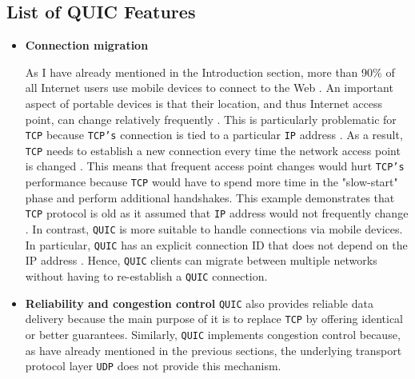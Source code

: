 \documentclass[12pt,a4paper,twoside,openright]{report}
\begin{document}
\subsection{List of QUIC Features}
\begin{itemize}
 \item \textbf{Connection migration} 
 
    As I have already mentioned in the Introduction section, more than 90\% of all Internet users use mobile devices to connect to the Web \cite{bib_number_of_mobile_users}.
    An important aspect of portable devices is that their location, and thus Internet access point, can change relatively frequently \cite{PollardBarry2019HiAP}.
    This is particularly problematic for \texttt{TCP} because \texttt{TCP's} connection is tied to a particular \texttt{IP} address \cite{PollardBarry2019HiAP}.
    As a result, \texttt{TCP} needs to establish a new connection every time the network access point is changed \cite{PollardBarry2019HiAP}.
    This means that frequent access point changes would hurt \texttt{TCP's} performance because \texttt{TCP} would have to spend more time in the "slow-start" phase and perform additional handshakes.
    This example demonstrates that \texttt{TCP} protocol is old as it assumed that \texttt{IP} address would not frequently change \cite{PollardBarry2019HiAP}.
    In contrast, \texttt{QUIC} is more suitable to handle connections via mobile devices.
    In particular, \texttt{QUIC} has an explicit connection ID that does not depend on the IP address \cite{PollardBarry2019HiAP}.
    Hence, \texttt{QUIC} clients can migrate between multiple networks without having to re-establish a \texttt{QUIC} connection.
 
 
  \item \textbf{Reliability and  congestion control}
    \texttt{QUIC} also provides reliable data delivery because the main purpose of it is to replace \texttt{TCP} \cite{ietf-quic-transport-draft} by offering identical or better guarantees. 
    Similarly, \texttt{QUIC} implements congestion control because, as have already mentioned in the previous sections, the underlying transport protocol layer \texttt{UDP} does not provide this mechanism. 
  

\end{itemize}
\end{document}
